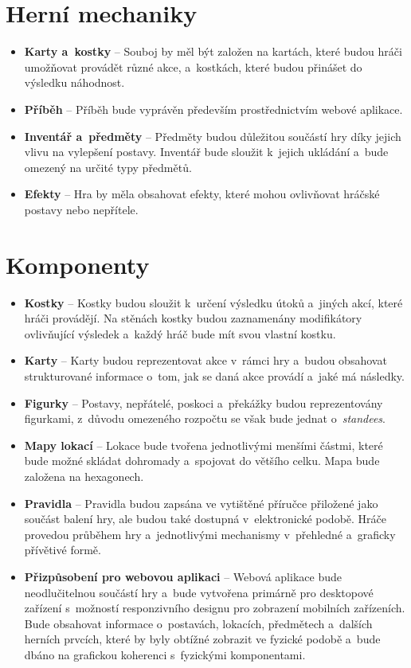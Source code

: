 \section{Herní mechaniky}
\label{sec:req_mechanics}

\begin{itemize}
    \item \textbf{Karty a~kostky} -- 
        Souboj by měl být založen na kartách, které budou hráči umožňovat provádět různé akce, a~kostkách, které budou přinášet do výsledku náhodnost.
    \item \textbf{Příběh} -- 
        Příběh bude vyprávěn především prostřednictvím webové aplikace.
    \item \textbf{Inventář a~předměty} -- 
        Předměty budou důležitou součástí hry díky jejich vlivu na vylepšení postavy. Inventář bude sloužit k~jejich ukládání a~bude omezený na určité typy předmětů.
    \item \textbf{Efekty} -- 
        Hra by měla obsahovat efekty, které mohou ovlivňovat hráčské postavy nebo nepřítele.
\end{itemize}

\section{Komponenty}
\label{sec:req_components}

\begin{itemize}
    \item \textbf{Kostky} -- 
        Kostky budou sloužit k~určení výsledku útoků a~jiných akcí, které hráči provádějí. Na stěnách kostky budou zaznamenány modifikátory ovlivňující výsledek a~každý hráč bude mít svou vlastní kostku.
    \item \textbf{Karty} --
        Karty budou reprezentovat akce v~rámci hry a~budou obsahovat strukturované informace o~tom, jak se daná akce provádí a~jaké má následky.
    \item \textbf{Figurky} --
        Postavy, nepřátelé, poskoci a~překážky budou reprezentovány figurkami, z~důvodu omezeného rozpočtu se však bude jednat o~\textit{standees}.
    \item \textbf{Mapy lokací} --
        Lokace bude tvořena jednotlivými menšími částmi, které bude možné skládat dohromady a~spojovat do většího celku. Mapa bude založena na hexagonech.
    \item \textbf{Pravidla} --
        Pravidla budou zapsána ve vytištěné příručce přiložené jako součást balení hry, ale budou také dostupná v~elektronické podobě. Hráče provedou průběhem hry a~jednotlivými mechanismy v~přehledné a~graficky přívětivé formě.
    \item \textbf{Přizpůsobení pro webovou aplikaci} --
        Webová aplikace bude neodlučitelnou součástí hry a~bude vytvořena primárně pro desktopové zařízení s~možností responzivního designu pro zobrazení mobilních zařízeních. Bude obsahovat informace o~postavách, lokacích, předmětech a~dalších herních prvcích, které by byly obtížné zobrazit ve fyzické podobě a~bude dbáno na grafickou koherenci s~fyzickými komponentami.
\end{itemize}

